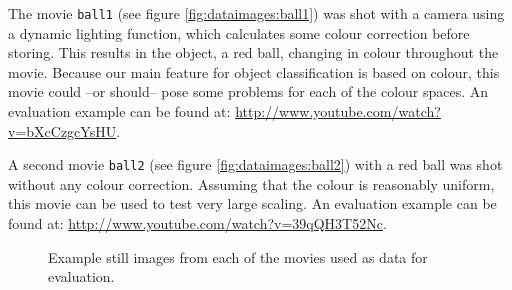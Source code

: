 \documentclass[a4paper,11pt]{article}
\begin{document}
The movie \texttt{ball1} (see figure \ref{fig:dataimages:ball1}) was shot with a camera using a dynamic lighting function, which calculates some colour correction before storing.
This results in the object, a red ball, changing in colour throughout the movie.
Because our main feature for object classification is based on colour, this movie could --or should-- pose some problems for each of the colour spaces. An evaluation example can be found at: \url{http://www.youtube.com/watch?v=bXcCzgcYsHU}.

A second movie \texttt{ball2} (see figure \ref{fig:dataimages:ball2}) with a red ball was shot without any colour correction.
Assuming that the colour is reasonably uniform, this movie can be used to test  very large scaling. An evaluation example can be found at: \url{http://www.youtube.com/watch?v=39qQH3T52Nc}.

\begin{figure}[ht]
  \centering

  \caption{Example still images from each of the movies used as data for evaluation.}
  \label{fig:dataimages}
\end{figure}
\end{document}

